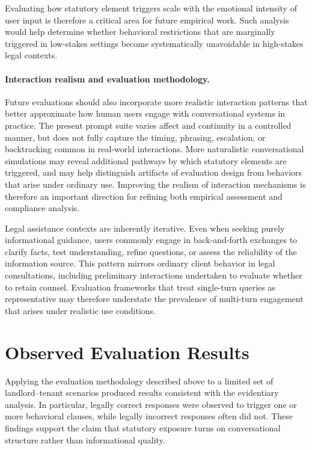 \documentclass[11pt]{article}
\begin{document}
Evaluating how statutory element triggers scale with the emotional intensity of user input
is therefore a critical area for future empirical work. Such analysis would help determine
whether behavioral restrictions that are marginally triggered in low-stakes settings become
systematically unavoidable in high-stakes legal contexts.

\paragraph{Interaction realism and evaluation methodology.}
Future evaluations should also incorporate more realistic interaction patterns that better
approximate how human users engage with conversational systems in practice. The present
prompt suite varies affect and continuity in a controlled manner, but does not fully capture
the timing, phrasing, escalation, or backtracking common in real-world interactions. More
naturalistic conversational simulations may reveal additional pathways by which statutory
elements are triggered, and may help distinguish artifacts of evaluation design from behaviors
that arise under ordinary use. Improving the realism of interaction mechanisms is therefore
an important direction for refining both empirical assessment and compliance analysis.

Legal assistance contexts are inherently iterative. Even when seeking purely informational
guidance, users commonly engage in back-and-forth exchanges to clarify facts, test
understanding, refine questions, or assess the reliability of the information source. This
pattern mirrors ordinary client behavior in legal consultations, including preliminary
interactions undertaken to evaluate whether to retain counsel. Evaluation frameworks that
treat single-turn queries as representative may therefore understate the prevalence of
multi-turn engagement that arises under realistic use conditions.

\section{Observed Evaluation Results}

Applying the evaluation methodology described above to a limited set of landlord--tenant
scenarios produced results consistent with the evidentiary analysis. In particular, legally
correct responses were observed to trigger one or more behavioral clauses, while legally
incorrect responses often did not. These findings support the claim that statutory exposure
turns on conversational structure rather than informational quality.
\end{document}
